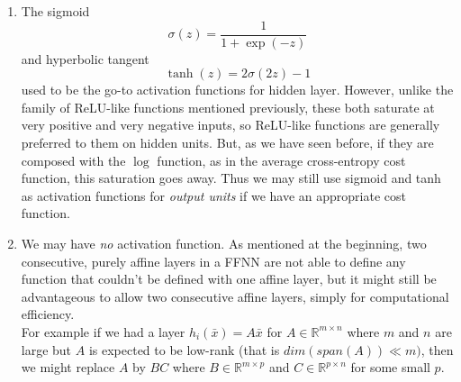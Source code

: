 \documentclass{article}
\begin{document}
\begin{itemize}
\begin{enumerate}
\item The sigmoid  $$\sigma(z) = \frac{1}{1+\exp(-z)}$$  and hyperbolic tangent $$\tanh(z) = 2\sigma(2z) -1$$ used to be the go-to activation functions for hidden layer.  However, unlike the family of ReLU-like functions mentioned previously, these both saturate at very positive and very negative inputs, so ReLU-like functions are generally preferred to them on hidden units.  But, as we have seen before, if they are composed with the $\log$ function, as in the average cross-entropy cost function, this saturation goes away.  Thus we may still use sigmoid and tanh as activation functions for \emph{output units} if we have an appropriate cost function.

\item We may have \emph{no} activation function. As mentioned at the beginning, two consecutive, purely affine layers in a FFNN are not able to define any function that couldn't be defined with one affine layer, but it might still be advantageous to allow two consecutive affine layers, simply for computational efficiency.\\
For example if we had a layer $h_i(\bar{x}) = A\bar{x}$ for $A\in \mathbb{R}^{m\times n}$ where $m$ and $n$ are large but $A$ is expected to be low-rank (that is $dim(span(A)) \ll m)$, then we might replace $A$ by $BC$ where $B \in \mathbb{R}^{m\times p}$ and  $C\in \mathbb{R}^{p \times n}$ for some small $p$.

\end{enumerate}
\end{itemize}
\end{document}
